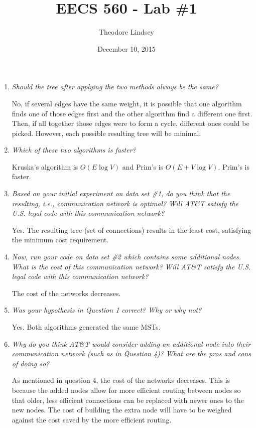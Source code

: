 \documentclass{article}
\title{EECS 560 - Lab \#1}
\author{Theodore Lindsey}
\date{December 10, 2015}
\begin{document}
\maketitle
\begin{enumerate}
\item \textit{Should the tree after applying the two methods always be the same?}

No, if several edges have the same weight, it is possible that one algorithm finds one of those edges first and the other algorithm find a different one first.  Then, if all together those edges were to form a cycle, different ones could be picked.  However, each possible resulting tree will be minimal.


\item \textit{Which of these two algorithms is faster?}

Kruska's algorithm is $O(E \log V)$ and Prim's is $O(E + V \log V)$.  Prim's is faster.


\item \textit{Based on your initial experiment on data set \#1, do you think that the resulting, i.e., communication network is optimal? Will AT\&T satisfy the U.S. legal code with this communication network?}

Yes.  The resulting tree (set of connections) results in the least cost, satisfying the minimum cost requirement.


\item \textit{Now, run your code on data set \#2 which contains some additional nodes. What is the cost of this communication network? Will AT\&T satisfy the U.S. legal code with this communication network?}

The cost of the networks decreases.


\item \textit{Was your hypothesis in Question 1 correct? Why or why not?}

Yes.  Both algorithms generated the same MSTs.


\item \textit{Why do you think AT\&T would consider adding an additional node into their communication network (such as in Question 4)? What are the pros and cons of doing so?}

As mentioned in question 4, the cost of the networks decreases.  This is because the added nodes allow for more efficient routing between nodes so that older, less efficient connections can be replaced with newer ones to the new nodes.  The cost of building the extra node will have to be weighed against the cost saved by the more efficient routing.
\end{enumerate}
\end{document}
